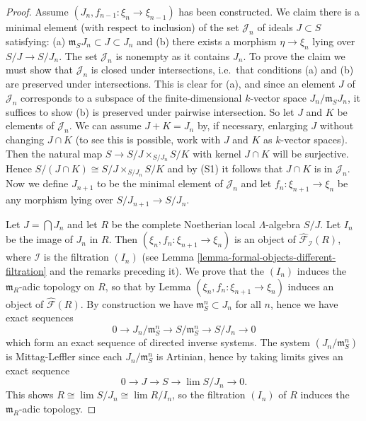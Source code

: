 \begin{proof}
\medskip \noindent
Assume $(J_{n}, f_{n-1}: \xi_{n} \rightarrow \xi_{n-1})$ has been constructed. 
We claim there is a minimal element (with respect to inclusion) of the set 
$\mathcal J_n$ of ideals $J \subset S$ satisfying: (a) $\mathfrak{m}_{S} J_{n} 
\subset J \subset J_{n}$ and (b) there exists a morphism $\eta \rightarrow 
\xi_{n}$ lying over $S/J \rightarrow S/J_n$.  The set $\mathcal J_n$ is 
nonempty as it contains $J_{n}$.  To prove the claim we must show that 
$\mathcal J_n$ is closed under intersections, i.e.\ that conditions (a) and (b) 
are preserved under intersections. This is clear for (a), and since an element 
$J$ of $\mathcal J_n$ corresponds to a subspace of the finite-dimensional 
$k$-vector space $J_n/\mathfrak{m}_{S}J_n$, it suffices to show (b) is 
preserved under pairwise intersection.  So let $J$ and $K$ be elements of 
$\mathcal J_n$.  We can assume $J+K = J_{n}$ by, if necessary, enlarging $J$ 
without changing $J \cap K$ (to see this is possible, work with $J$ and $K$ as 
$k$-vector spaces).  Then the natural map $S \rightarrow S/J \times_{S/J_n} 
S/K$ with kernel $J \cap K$ will be surjective.  Hence $S/(J \cap K) \cong S/J 
\times_{S/J_n} S/K$ and by (S1) it follows that $J \cap K$ is in $\mathcal 
J_n$.  Now we define $J_{n+1}$ to be the minimal element of $\mathcal J_n$ and 
let $f_{n}: \xi_{n+1} \rightarrow \xi_{n}$ be any morphism lying over 
$S/J_{n+1} \rightarrow S/J_{n}$.

\medskip \noindent
Let $J = \bigcap J_{n}$ and let $R$ be the complete Noetherian local 
$\Lambda$-algebra $S/J$.  Let $I_n$ be the image of $J_n$ in $R$. Then 
$(\xi_{n}, f_{n}: \xi_{n+1} \rightarrow \xi_{n})$ is an object of 
$\widehat{\mathcal F}_{\mathcal I}(R)$, where $\mathcal I$ is the filtration 
$(I_{n})$ (see Lemma \ref{lemma-formal-objects-different-filtration} and the 
remarks preceding it).  We prove that the $(I_n)$ induces the 
$\mathfrak{m}_R$-adic topology on $R$, so that by Lemma $(\xi_{n}, f_{n}: 
\xi_{n+1} \rightarrow \xi_{n})$ induces an object of $\widehat{\mathcal F}(R)$. 
 By construction we have $\mathfrak{m}_{S}^n \subset J_n$ for all $n$, hence we 
have exact sequences
\[ 0 \rightarrow J_n/\mathfrak{m}_{S}^n \rightarrow S/\mathfrak{m}^n_{S} 
\rightarrow S/J_{n} \rightarrow 0 \]
which form an exact sequence of directed inverse systems.  The system 
$(J_n/\mathfrak{m}_{S}^n)$ is Mittag-Leffler since each 
$J_n/\mathfrak{m}_{S}^n$ is Artinian, hence by \cite[Lemma 
7.75.4]{stacks-project} taking limits gives an exact sequence
\[ 0 \rightarrow J \rightarrow S \rightarrow \lim S/J_n \rightarrow 0 .\]
This shows $R \cong \lim S/J_n \cong \lim R/I_n$, so the filtration $(I_n)$ of 
$R$ induces the $\mathfrak{m}_{R}$-adic topology.


\end{proof}

